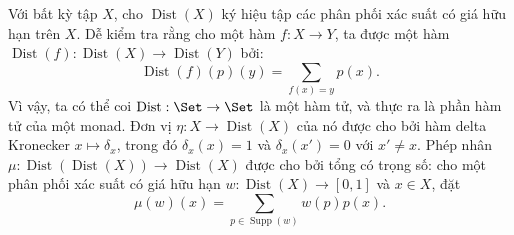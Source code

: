Với bất kỳ tập $X$, cho $\operatorname{Dist}(X)$ ký hiệu tập các phân phối xác suất có giá hữu hạn trên $X$. Dễ kiểm tra rằng cho một hàm $f:X\to Y$, ta được một hàm $\operatorname{Dist}(f):\operatorname{Dist}(X)\to\operatorname{Dist}(Y)$ bởi:
\[
\operatorname{Dist}(f)(p)(y)=\sum_{f(x)=y}p(x).
\]
Vì vậy, ta có thể coi $\operatorname{Dist}:\Set\to\Set$ là một hàm tử, và thực ra là phần hàm tử của một monad. Đơn vị $\eta:X\to\operatorname{Dist}(X)$ của nó được cho bởi hàm delta Kronecker $x\mapsto\delta_x$, trong đó $\delta_x(x)=1$ và $\delta_x(x')=0$ với $x'\ne x$. Phép nhân $\mu:\operatorname{Dist}(\operatorname{Dist}(X))\to\operatorname{Dist}(X)$ được cho bởi tổng có trọng số: cho một phân phối xác suất có giá hữu hạn $w:\operatorname{Dist}(X)\to[0,1]$ và $x\in X$, đặt
\[
\mu(w)(x)=\sum_{p\in\operatorname{Supp}(w)}w(p)p(x).
\]

